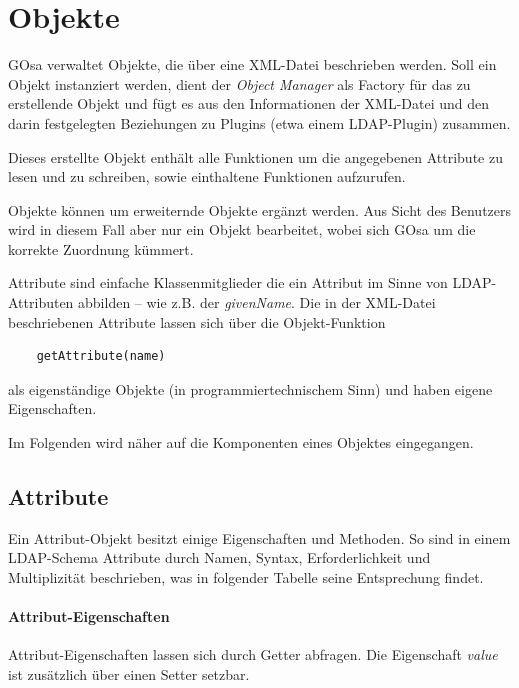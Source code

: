 \section{Objekte}

GOsa verwaltet Objekte, die über eine XML-Datei beschrieben werden. Soll ein Objekt
instanziert werden, dient der \textit{Object Manager} als Factory für das zu
erstellende Objekt und fügt es aus den Informationen der XML-Datei und den darin
festgelegten Beziehungen zu Plugins (etwa einem LDAP-Plugin) zusammen.

Dieses erstellte Objekt enthält alle Funktionen um die angegebenen Attribute
zu lesen und zu schreiben, sowie einthaltene Funktionen aufzurufen.

Objekte können um erweiternde Objekte ergänzt werden. Aus Sicht des Benutzers
wird in diesem Fall aber nur ein Objekt bearbeitet, wobei sich GOsa um die
korrekte Zuordnung kümmert.

Attribute sind einfache Klassenmitglieder die ein Attribut im
Sinne von LDAP-Attri\-bu\-ten abbilden -- wie z.B. der \textit{givenName}. Die in der
XML-Datei beschriebenen Attribute lassen sich über die Objekt-Funktion

\begin{verbatim}
    getAttribute(name)
\end{verbatim}

als eigenständige Objekte (in programmiertechnischem Sinn) und haben eigene
Eigenschaften. 

Im Folgenden wird näher auf die Komponenten eines Objektes eingegangen.

\subsection{Attribute}

Ein Attribut-Objekt besitzt einige Eigenschaften und Methoden. So sind in
einem LDAP-Schema Attribute durch Namen, Syntax, Erforderlichkeit und Multiplizität
beschrieben, was in folgender Tabelle seine Entsprechung findet.

\paragraph{Attribut-Eigenschaften}

Attribut-Eigenschaften lassen sich durch Getter abfragen. Die Eigenschaft
\textit{value} ist zusätzlich über einen Setter setzbar.

